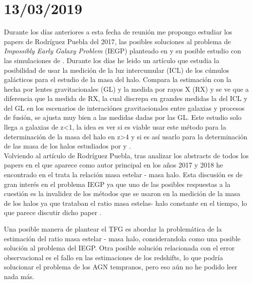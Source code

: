 \section*{13/03/2019}
Durante los días anteriores a esta fecha de reunión me propongo estudiar los papers de Rodríguez Puebla del 2017, las posibles soluciones al problema de \textit{Impossibly Early Galaxy Problem} (IEGP) planteado en \cite{steinhardt2016impossibly} y su posible estudio con las simulaciones de \cite{roca2016garrotxa}. Durante los días he leido un artículo \cite{montes2018intracluster} que estudia la posibilidad de usar la medición de la luz intercumular (ICL) de los cúmulos galácticos para el estudio de la masa del halo. Compara la estimación con la hecha por lentes gravitacionales (GL) y la medida por rayos X (RX) y se ve que a diferencia que la medida de RX, la cual discrepa en grandes medidas la del ICL y del GL en los escenarios de interaciónes gravitacionales entre galaxias y procesos de fusión, se ajusta muy bien a las medidas dadas por las GL. Este estudio solo llega a galaxias de z<1, la idea es ver si es viable usar este método para la determinación de la masa del halo en z>4 y si es así usarlo para la determinación de las masa de los halos estudiados por \citep[CANDELS]{grogin2011candels} y \citep[SPLASH]{capak2012splash}.\\

Volviendo al artículo de Rodríguez Puebla, tras analizar los abstracts de todos los papers en el que aparece como autor principal en los años 2017 y 2018 he encontrado \cite{rodriguez2017constraining} en el trata la relación masa estelar - masa halo. Esta discusión es de gran interés en el problema IEGP ya que uno de las posibles respuestas a la cuestión es la invalidez de los métodos que se usaron en la medición de la masa de los halos ya que trataban el ratio masa estelas- halo constante en el tiempo, lo que parece discutir dicho paper \citep{rodriguez2017constraining}. 
\begin{obs}
Una posible manera de plantear el TFG es abordar la problemática de la estimación del ratio masa estelar - masa halo, considerandola como una posible solución al problema del IEGP. Otra posible solución relacionada con el error observacional es el fallo en las estimaciones de los redshifts, lo que podría solucionar el problema de los AGN tempranos, pero eso aún no he podido leer nada más.
\end{obs}

